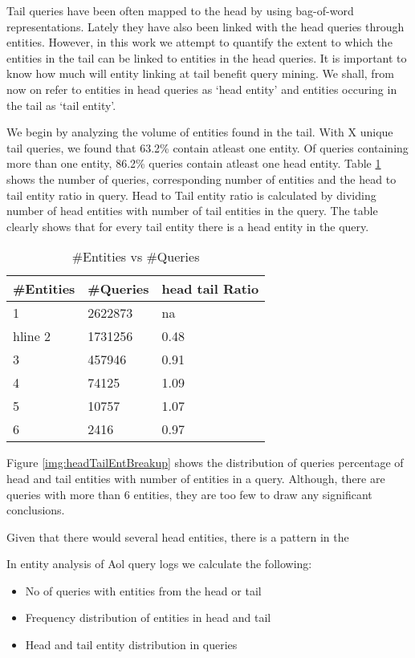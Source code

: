 Tail queries have been often mapped to the head \cite{} by using bag-of-word representations.
Lately they have also been linked with the head queries through entities. However, in this work
we attempt to quantify the extent to which the entities in the tail can be linked to entities 
in the head queries. It is important to know how much will entity linking at tail benefit query mining. 
We shall, from now on refer to entities in head queries as `head entity' 
and entities occuring in the tail as `tail entity'. 

We begin by analyzing the volume of entities found in the tail. With X unique tail queries, we 
found that 63.2\% contain atleast one entity. Of queries containing more than one entity,  
86.2\% queries contain atleast one head entity. Table \ref{table:entDist} shows the number of 
queries, corresponding number of entities and the head to tail entity ratio in query. 
Head to Tail entity ratio is calculated by dividing number of head entities with number of 
tail entities in the query. The table clearly shows that for every tail entity there is a 
head entity in the query.
\begin{table}
\caption{\#Entities vs \#Queries}
\label{table:entDist}
\centering
\begin{tabular}{|l|l|l}
\hline
\#Entities & \#Queries & head tail Ratio \\ \hline
1 & 2622873 & na\\hline
2 & 1731256 & 0.48\\ \hline
3 & 457946  & 0.91\\ \hline
4 & 74125 & 1.09 \\ \hline
5 & 10757 & 1.07\\ \hline
6 & 2416  & 0.97\\ \hline
\end{tabular}
\end{table}

Figure \ref{img:headTailEntBreakup} shows the distribution of queries percentage of head and tail entities with number 
of entities in a query. Although, there are queries with more than 6 entities, 
they are too few to draw any significant conclusions. 

%
Given that there would several head entities, there is a pattern in the 


In entity analysis of Aol query logs we calculate the following:
\begin{itemize}
\item No of queries with entities from the head or tail
\item Frequency distribution of entities in head and tail
\item Head and tail entity distribution in queries
\end{itemize}




